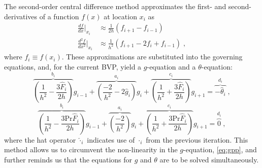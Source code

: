 \documentclass[11pt]{article}
\begin{document}
The second-order central difference method  approximates the first- and second-derivatives of a function $f(x)$ at location $x_i$ as
\begin{equation}
\begin{aligned}
\frac{d f}{d x} \Big|_{x_i}
&\approx
\frac{1}{2h} \left( f_{i+1} - f_{i-1} \right)
\\
\frac{d^2 f}{d x^2} \Big|_{x_i}
&\approx
\frac{1}{h^2} \left( f_{i+1} - 2 f_i + f_{i-1} \right)
\;,
\end{aligned}
\end{equation}
where $f_i \equiv f(x_i)$. These approximations are substituted into the governing equations, and, for the current BVP, yield a $g$-equation and a $\theta$-equation:
\begin{equation}
  \overbrace{\left( \frac{1}{h^2} - \frac{3 \hat{F}_i}{2h} \right)}^{b_i} g_{i-1}
+ \overbrace{\left( \frac{-2}{h^2} - 2 \hat{g}_i \right)}^{a_i} g_i
+ \overbrace{\left( \frac{1}{h^2} + \frac{3 \hat{F}_i}{2h} \right)}^{c_i} g_{i+1}
= \overbrace{-\hat{\theta}_i}^{d_i}
\;,
\label{eq:g_eq}
\end{equation}
\begin{equation}
  \overbrace{\left( \frac{1}{h^2} - \frac{3 \text{Pr} \hat{F}_i}{2h} \right)}^{b_i} g_{i-1}
+ \overbrace{\left( \frac{-2}{h^2} \right)}^{a_i} g_i
+ \overbrace{\left( \frac{1}{h^2} + \frac{3 \text{Pr} \hat{F}_i}{2h} \right)}^{c_i} g_{i+1}
= \overbrace{0}^{d_i}
\;,
\label{eq:th_eq}
\end{equation}
where the hat operator $\hat{\cdot}_i$ indicates use of $\cdot_i$ from the previous iteration. This method allows us to circumvent the non-linearity in the $g$-equation, \eqref{eq:gpp}, and further reminds us that the equations for $g$ and $\theta$ are to be solved simultaneously.
\end{document}
